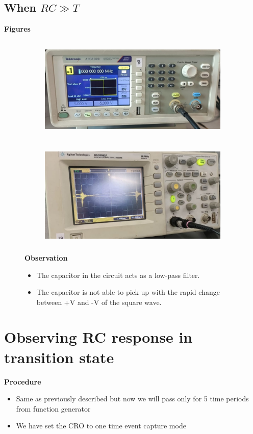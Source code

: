 \documentclass[a4paper,12pt]{article}
\begin{document}
\subsection{When $RC\gg T$}
\begin{itemize}
    \item \textbf{Figures}
    \begin{figure}[H]
    \centering
    \begin{subfigure}{0.48\textwidth}
        \centering
        \includegraphics[height=5cm]{figs/inputrc>>t.jpeg}
    \end{subfigure}
    \hspace{0.04\textwidth} %
    \begin{subfigure}{0.48\textwidth}
        \centering
        \includegraphics[height=5cm]{figs/outputrc>>t.jpeg}
    \end{subfigure}
    \item \textbf{Observation}
    \begin{itemize}
        \item The capacitor in the circuit acts as a low-pass filter.
        \item The capacitor is not able to pick up with the rapid change between +V and -V of the square wave.
    \end{itemize}
\end{figure}
\end{itemize}
\newpage

\section{Observing RC response in transition state}
\textbf{Procedure}
\begin{itemize}
    \item Same as previously described but now we will pass only for 5 time periods from function generator
    \item We have set the CRO to one time event capture mode
\end{itemize}
\end{document}
